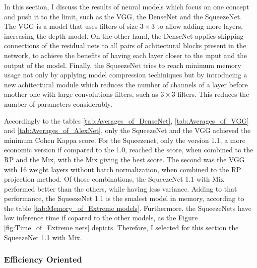 In this section, I discuss the results of neural models which focus on one concept and push it to the limit, such as the VGG, the DenseNet and the SqueezeNet. The VGG is a model that uses filters of size $3\times 3$ to allow adding more layers, increasing the depth model. On the other hand, the DenseNet applies skipping connections of the residual nets to all pairs of achitectural blocks present in the network, to achieve the benefits of having each layer closer to the input and the output of the model. Finally, the SqueezeNet tries to reach minimum memory usage not only by applying model compression techiniques but by introducing a new achitectural module which reduces the number of channels of a layer before another one with large convolutions filters, such as $3 \times 3$ filters. This reduces the number of parameters considerably.

Accordingly to the tables \ref{tab:Averages_of_DenseNet}, \ref{tab:Averages_of_VGG} and \ref{tab:Averages_of_AlexNet}, only the SqueezeNet and the VGG achieved the minimum Cohen Kappa score. For the Squeezenet, only the version 1.1, a more economic version if compared to the 1.0, reached the score, when combined to the \acrshort{RP} and the \acrshort{Mix}, with the \acrshort{Mix} giving the best score. The second was the VGG with 16 weight layers without batch normalization, when combined to the \acrshort{RP} projection method. Of those combinations, the SqueezeNet 1.1 with \acrshort{Mix} performed better than the others, while having less variance. Adding to that performance, the SqueezeNet 1.1 is the smalest model in memory, according to the table \ref{tab:Memory_of_Extreme models}. Furthermore, the SqueezeNets have low inference time if copared to the other models, as the Figure \ref{fig:Time_of_Extreme nets} depicts. Therefore, I selected for this section the SqueezeNet 1.1 with \acrshort{Mix}.






\FloatBarrier

\subsubsection{Efficiency Oriented}

